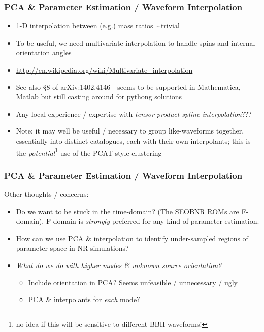 \documentclass{beamer}
\begin{document}
\begin{frame}
    \frametitle{PCA \& Parameter Estimation / Waveform Interpolation}
    \small
    \begin{itemize}
        \item 1-D interpolation between (e.g.) mass ratios $\sim$trivial
        \item To be useful, we need multivariate interpolation to handle spins
            and internal orientation angles
        \item \url{http://en.wikipedia.org/wiki/Multivariate_interpolation}
        \item See also \S8 of arXiv:1402.4146 - seems to be supported in
            Mathematica, Matlab but still casting around for pythong solutions
        \item Any local experience / expertise with \emph{tensor product spline
            interpolation}???
        \item Note: it may well be useful / necessary to group like-waveforms
            together, essentially into distinct catalogues, each with their own
            interpolants; this is the \emph{potential}\footnote{no idea if this
            will be sensitive to different BBH waveforms!} use of the PCAT-style
            clustering
    \end{itemize}

\end{frame}

\begin{frame}
    \frametitle{PCA \& Parameter Estimation / Waveform Interpolation}
    \small
    Other thoughts / concerns:
    \begin{itemize}
        \item Do we want to be stuck in the time-domain? (The SEOBNR ROMs are
            F-domain).  F-domain is \emph{strongly} preferred for any kind of
            parameter estimation.
        \item How can we use PCA \& interpolation to identify under-sampled
            regions of parameter space in NR simulations?
        \item \emph{What do we do with higher modes \& unknown source
        orientation?}
        \begin{itemize}
            \item Include orientation in PCA?  Seems unfeasible / unnecessary /
                ugly
            \item PCA \& interpolants for \emph{each} mode?
        \end{itemize}
    \end{itemize}

\end{frame}
\end{document}
